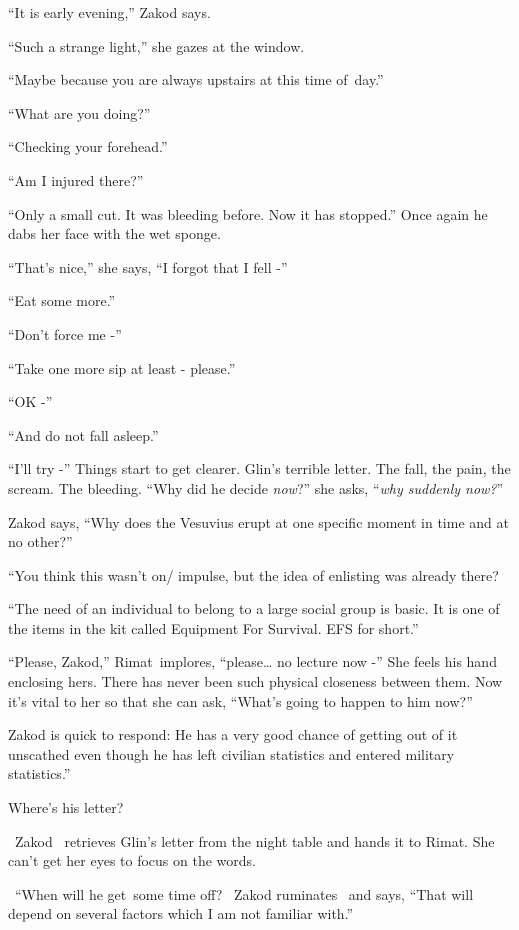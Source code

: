 \documentclass[letterpaper]{article}
\begin{document}
{}``It is early evening,'' Zakod says. 

{}``Such a strange light,'' she gazes at the window. 

{}``Maybe because you are always upstairs at this time of~day.'' 

{}``What are you doing?'' 

{}``Checking your forehead.'' 

{}``Am I injured there?'' 

{}``Only a small cut. It was bleeding before. Now it has stopped.'' Once again he dabs her face with the wet sponge. 

{}``That's nice,'' she says, ``I forgot that I fell -'' 

{}``Eat some more.''

{}``Don't force me -'' 

{}``Take one more sip at least - please.'' 

{}``OK -'' 

{}``And do not fall asleep.''

{}``I'll try -'' Things start to get clearer. Glin's terrible letter. The fall, the pain, the scream. The bleeding.
``Why did he decide \textit{now}?'' she asks, ``\textit{why suddenly now?}{}''

Zakod says, ``Why does the Vesuvius erupt at one specific moment in time and at no other?'' 

{}``You think this wasn't on/ impulse, but the idea of enlisting was already there?{\textquotedbl} 

{}``The need of an individual to belong to a large social group is basic. It is one of the items in the kit called
Equipment For Survival. EFS for short.'' 

{}``Please, Zakod,'' Rimat~implores, ``please{\dots} no lecture now -'' She feels his hand enclosing hers. There has
never been such physical closeness{ }between them. Now it's vital to her so that she can ask, ``What's
going to happen to him now?'' 

Zakod is quick to respond: {\textquotedbl}He has a very good chance of getting out of it unscathed even though he has
left civilian statistics and entered military statistics.'' 

{\textquotedbl}Where's his letter?{\textquotedbl} 

~Zakod~ retrieves Glin's letter from the night table and hands it to Rimat. She can't get her eyes to focus on the
words. 

\ {}``When will he get~some time off?{\textquotedbl} \ Zakod ruminates \ and says, ``That will depend on several factors
which I am not familiar with.'' \ 
\end{document}
